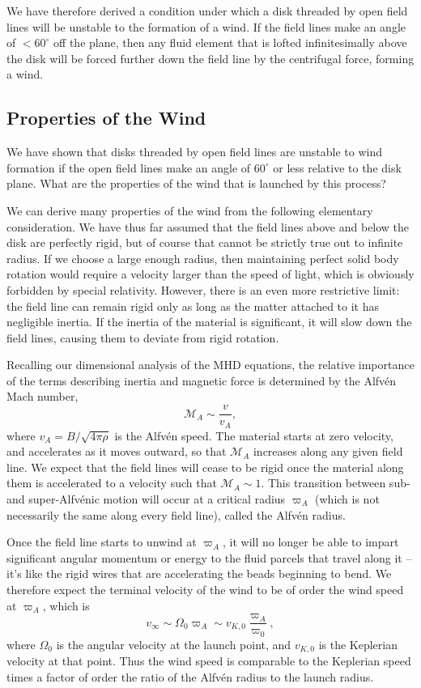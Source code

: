 We have therefore derived a condition under which a disk threaded by open field lines will be unstable to the formation of a wind. If the field lines make an angle of $<60^\circ$ off the plane, then any fluid element that is lofted infinitesimally above the disk will be forced further down the field line by the centrifugal force, forming a wind.

\subsection{Properties of the Wind}

We have shown that disks threaded by open field lines are unstable to wind formation if the open field lines make an angle of $60^\circ$ or less relative to the disk plane. What are the properties of the wind that is launched by this process?

We can derive many properties of the wind from the following elementary consideration. We have thus far assumed that the field lines above and below the disk are perfectly rigid, but of course that cannot be strictly true out to infinite radius. If we choose a large enough radius, then maintaining perfect solid body rotation would require a velocity larger than the speed of light, which is obviously forbidden by special relativity. However, there is an even more restrictive limit: the field line can remain rigid only as long as the matter attached to it has negligible inertia. If the inertia of the material is significant, it will slow down the field lines, causing them to deviate from rigid rotation.

Recalling our dimensional analysis of the MHD equations, the relative importance of the terms describing inertia and magnetic force is determined by the Alfv\'en Mach number,
\begin{equation}
\mathcal{M}_A \sim \frac{v}{v_A},
\end{equation}
where $v_A = B/\sqrt{4\pi \rho}$ is the Alfv\'{e}n speed. The material starts at zero velocity, and accelerates as it moves outward, so that $\mathcal{M}_A$ increases along any given field line. We expect that the field lines will cease to be rigid once the material along them is accelerated to a velocity such that $\mathcal{M}_A \sim 1$. This transition between sub- and super-Alfv\'{e}nic motion will occur at a critical radius $\varpi_A$ (which is not necessarily the same along every field line), called the Alfv\'{e}n radius.

Once the field line starts to unwind at $\varpi_A$, it will no longer be able to impart significant angular momentum or energy to the fluid parcels that travel along it -- it's like the rigid wires that are accelerating the beads beginning to bend. We therefore expect the terminal velocity of the wind to be of order the wind speed at $\varpi_A$, which is
\begin{equation}
v_\infty \sim \Omega_0 \varpi_A \sim v_{K,0} \frac{\varpi_A}{\varpi_0},
\end{equation}
where $\Omega_0$ is the angular velocity at the launch point, and $v_{K,0}$ is the Keplerian velocity at that point. Thus the wind speed is comparable to the Keplerian speed times a factor of order the ratio of the Alfv\'{e}n radius to the launch radius.

